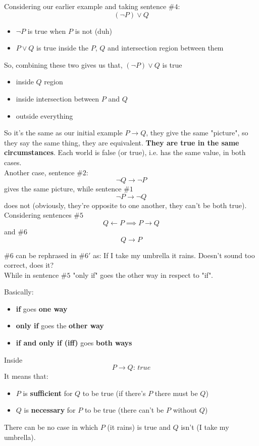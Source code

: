 \documentclass[11pt]{article}
\begin{document}
	\newpage
	
	Considering our earlier example and taking sentence $\#4$:
	$$ (\neg P) \vee Q $$
	\begin{itemize}
		\item $\neg P$ is true when $P$ is not (duh)
		\item $P \vee Q$ is true inside the $P$, $Q$ and intersection region between them
	\end{itemize}
	
	So, combining these two gives us that, $(\neg P) \vee Q$ is true
	\begin{itemize}
		\item inside $Q$ region
		\item inside intersection between $P$ and $Q$
		\item outside everything
	\end{itemize}
	
	So it's the same as our initial example $P \rightarrow Q$, they give the same "picture", so they say the same thing, they are equivalent. \textbf{They are true in the same circumstances}. Each world is false (or true), i.e. has the same value, in both cases.\\
	
	Another case, sentence $\#2$:
	$$ \neg Q \rightarrow \neg P$$
	gives the same picture, while sentence $\# 1$
	$$ \neg P \rightarrow \neg Q$$
	does not (obviously, they're opposite to one another, they can't be both true).\\
	
	Considering sentences  $\#5$ 
	$$ Q \leftarrow P \implies P \rightarrow Q $$
	and $\#6$
	$$ Q \rightarrow P$$
	
	$\# 6$ can be rephrased in $\# 6'$ as: If I take my umbrella it rains. Doesn't sound too correct, does it?\\
	While in sentence $\#5$ "only if" goes the other way in respect to "if".\\
	
	\newpage
	
	Basically:
	\begin{itemize}
		\item \textbf{if} goes \textbf{one way} 
		\item \textbf{only if} goes the \textbf{other way} 
		\item \textbf{if and only if (iff)} goes \textbf{both ways}
	\end{itemize}
	
	Inside
	$$ P \rightarrow Q: \, true$$
	It means that: 
	\begin{itemize}
		\item $P$ is \textbf{sufficient} for $Q$ to be true (if there's $P$ there must be $Q$)
		\item $Q$ is \textbf{necessary} for $P$ to be true (there can't be $P$ without $Q$)
	\end{itemize}
	There can be no case in which $P$ (it rains) is true and $Q$ isn't (I take my umbrella).\\
	
\end{document}
